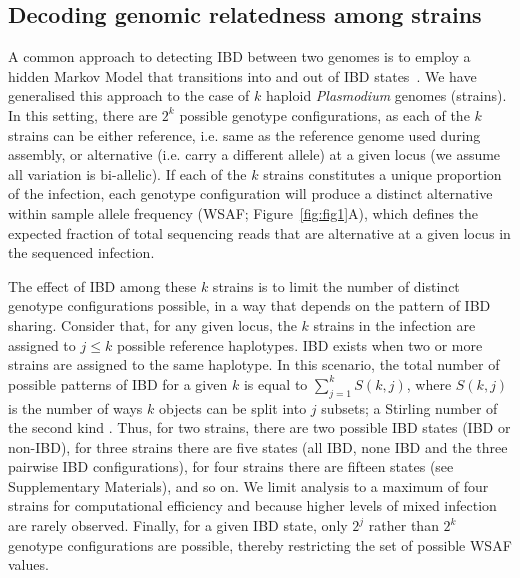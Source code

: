 \documentclass[9pt,lineno]{elife}
\begin{document}
\subsection{Decoding genomic relatedness among strains}

A common approach to detecting IBD between two genomes is to employ a hidden Markov Model that transitions into and out of IBD states~\citep{Chang2015, Gusev2009, Gusev2011}.  We have generalised this approach to the case of $k$ haploid {\it Plasmodium} genomes (strains). In this setting, there are $2^k$ possible genotype configurations, as each of the $k$ strains can be either reference, i.e. same as the reference genome used during assembly, or alternative (i.e. carry a different allele) at a given locus (we assume all variation is bi-allelic). If each of the $k$ strains constitutes a unique proportion of the infection, each genotype configuration will produce a distinct alternative within sample allele frequency (WSAF; Figure~\ref{fig:fig1}A), which defines the expected fraction of total sequencing reads that are alternative at a given locus in the sequenced infection.

The effect of IBD among these $k$ strains is to limit the number of distinct genotype configurations possible, in a way that depends on the pattern of IBD sharing. Consider that, for any given locus, the $k$ strains in the infection are assigned to $j \leq k$ possible reference haplotypes. IBD exists when two or more strains are assigned to the same haplotype. In this scenario, the total number of possible patterns of IBD for a given $k$ is equal to $\sum_{j=1}^{k} S(k,j)$, where $S(k,j)$ is the number of ways $k$ objects can be split into $j$ subsets; a Stirling number of the second kind \citep{Ronald1988}. Thus, for two strains, there are two possible IBD states (IBD or non-IBD), for three strains there are five states (all IBD, none IBD and the three pairwise IBD configurations), for four strains there are fifteen states (see Supplementary Materials), and so on. We limit analysis to a maximum of four strains for computational efficiency and because higher levels of mixed infection are rarely observed. Finally, for a given IBD state, only $2^j$ rather than $2^k$ genotype configurations are possible, thereby restricting the set of possible WSAF values.
\end{document}
